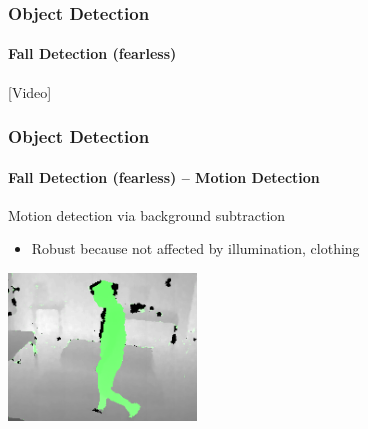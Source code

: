 \documentclass[xetex,professionalfont]{beamer}
\begin{document}
\begin{frame}
\frametitle{Object Detection}
\framesubtitle{Fall Detection (fearless)}

\begin{center}
	[Video]
\end{center}

\end{frame}


\begin{frame}
\frametitle{Object Detection}
\framesubtitle{Fall Detection (fearless) -- Motion Detection}

Motion detection via background subtraction
\begin{itemize}
	\item Robust because not affected by illumination, clothing
\end{itemize}


\bigskip
\begin{center}
\includegraphics[width=5cm]{figures/fearless-depth.png}
\end{center}

\end{frame}

\end{document}
